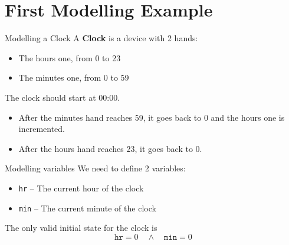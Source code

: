 \section[image=bgphoto_cut]{First Modelling Example}
\begin{frame}[plain]{}
    \sectionpage
\end{frame}

\begin{frame}{Modelling a Clock}
    A \textbf{Clock} is a device with 2 hands:
    \begin{itemize}
        \item The hours one, from 0 to 23
        \item The minutes one, from 0 to 59
    \end{itemize}
    \pause
    The clock should start at 00:00.
    \pause
    \begin{itemize}
        \item After the minutes hand reaches 59, it goes back to 0 and the hours one is incremented.
        \item After the hours hand reaches 23, it goes back to 0.
    \end{itemize}
\end{frame}

\begin{frame}{Modelling variables}
    We need to define 2 variables:
    \pause
    \begin{itemize}[<+->]
        \item \texttt{hr} -- The current hour of the clock
        \item \texttt{min} -- The current minute of the clock
    \end{itemize}
    \onslide<+->
    The only valid initial state for the clock is
    \[
        \texttt{hr} = 0 \quad \land \quad \texttt{min} = 0
    \]
\end{frame}

